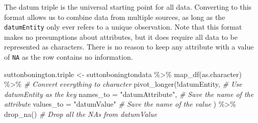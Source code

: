 \documentclass{article}
\newenvironment{Shaded}{\begin{snugshade}}{\end{snugshade}}
\newcommand{\AttributeTok}[1]{\textcolor[rgb]{0.77,0.63,0.00}{#1}}
\newcommand{\CommentTok}[1]{\textcolor[rgb]{0.56,0.35,0.01}{\textit{#1}}}
\newcommand{\DecValTok}[1]{\textcolor[rgb]{0.00,0.00,0.81}{#1}}
\newcommand{\FloatTok}[1]{\textcolor[rgb]{0.00,0.00,0.81}{#1}}
\newcommand{\FunctionTok}[1]{\textcolor[rgb]{0.00,0.00,0.00}{#1}}
\newcommand{\NormalTok}[1]{#1}
\newcommand{\OtherTok}[1]{\textcolor[rgb]{0.56,0.35,0.01}{#1}}
\newcommand{\SpecialCharTok}[1]{\textcolor[rgb]{0.00,0.00,0.00}{#1}}
\newcommand{\StringTok}[1]{\textcolor[rgb]{0.31,0.60,0.02}{#1}}
\begin{document}
\begin{Shaded}
\end{Shaded}

The datum triple is the universal starting point for all data. Converting to this format allows us to combine data from multiple sources, as long as the \texttt{datumEntity} only ever refers to a unique observation. Note that this format makes no presumptions about attributes, but it does require all data to be represented as characters. There is no reason to keep any attribute with a value of \texttt{NA} as the row contains no information.

\begin{Shaded}
\begin{Highlighting}[]
\NormalTok{suttonbonington.triple }\OtherTok{\textless{}{-}}\NormalTok{ suttonboningtondata }\SpecialCharTok{\%\textgreater{}\%} 
                  \FunctionTok{map\_df}\NormalTok{(as.character) }\SpecialCharTok{\%\textgreater{}\%} \CommentTok{\# Convert everything to character}
                  \FunctionTok{pivot\_longer}\NormalTok{(}\SpecialCharTok{!}\NormalTok{datumEntity, }\CommentTok{\# Use datumEntity as the key}
                  \AttributeTok{names\_to =} \StringTok{"datumAttribute"}\NormalTok{, }\CommentTok{\# Save the name of the attribute}
                  \AttributeTok{values\_to =} \StringTok{"datumValue"} \CommentTok{\# Save the name of the value}
\NormalTok{                  ) }\SpecialCharTok{\%\textgreater{}\%} 
                  \FunctionTok{drop\_na}\NormalTok{() }\CommentTok{\# Drop all the NAs from datumValue}
\end{Highlighting}
\end{Shaded}
\end{document}
